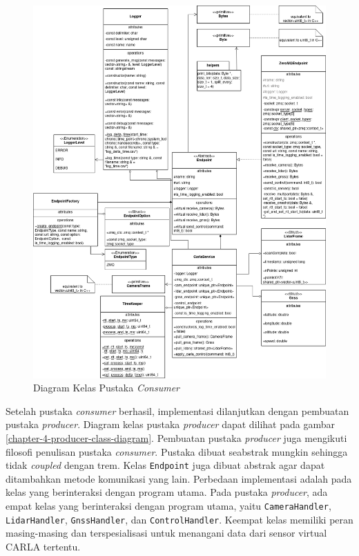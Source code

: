 \begin{figure}[!htbp]
	\centering
	\includegraphics[width=1.0\textwidth]{resources/chapter-4/consumer-class_diagram.png}
	\caption{Diagram Kelas Pustaka \textit{Consumer}}
	\label{chapter-4-consumer-class-diagram}
\end{figure}

Setelah pustaka \textit{consumer} berhasil, implementasi dilanjutkan dengan
pembuatan pustaka \textit{producer}. Diagram kelas pustaka \textit{producer}
dapat dilihat pada gambar \ref{chapter-4-producer-class-diagram}. Pembuatan
pustaka \textit{producer} juga mengikuti filosofi penulisan pustaka
\textit{consumer}. Pustaka dibuat seabstrak mungkin sehingga tidak
\textit{coupled} dengan trem. Kelas \texttt{Endpoint} juga dibuat abstrak agar
dapat ditambahkan metode komunikasi yang lain. Perbedaan implementasi adalah
pada kelas yang berinteraksi dengan program utama. Pada pustaka
\textit{producer}, ada empat kelas yang berinteraksi dengan program utama, yaitu
\texttt{CameraHandler}, \texttt{LidarHandler}, \texttt{GnssHandler}, dan
\texttt{ControlHandler}. Keempat kelas memiliki peran masing-masing dan
terspesialisasi untuk menangani data dari sensor virtual CARLA tertentu.

